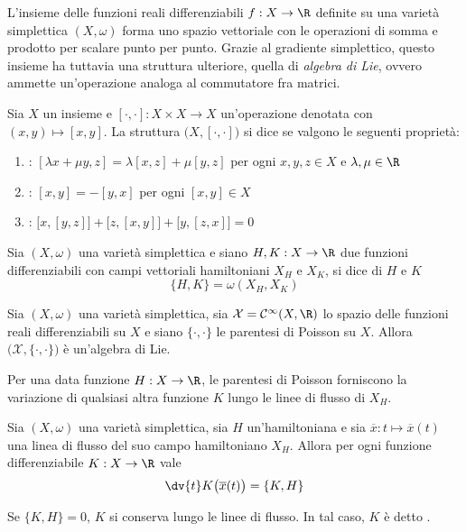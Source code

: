 L'insieme delle funzioni reali differenziabili $f:X \to \R$ definite su una varietà simplettica $(X, \omega)$ forma uno spazio vettoriale con le operazioni di somma e prodotto per scalare punto per punto. Grazie al gradiente simplettico, questo insieme ha tuttavia una struttura ulteriore, quella di \emph{algebra di Lie}, ovvero ammette un'operazione analoga al commutatore fra matrici.
\begin{definition}
  Sia $X$ un insieme e $[\cdot , \cdot]:X \times X \to X$ un'operazione denotata con $(x,y) \mapsto [x,y]$. La struttura $\big(X, [\cdot ,\cdot ]\big)$ si dice  se valgono le seguenti proprietà: \begin{enumerate}
    \item {}: $[\lambda x + \mu y, z] = \lambda [x, z] + \mu[y,z]$ per ogni $x,y,z \in X$ e $\lambda, \mu \in  \R$
    \item {}: $[x,y] = -[y,x]$ per ogni $[x,y] \in X$
    \item {}: $\big[x,[y,z]\big] + \big[z,[x,y]\big] + \big[y,[z,x]\big] = 0$
  \end{enumerate}
\end{definition}

\begin{definition}
  Sia $(X, \omega)$ una varietà simplettica e siano $H,K: X \to \R$ due funzioni differenziabili con campi vettoriali hamiltoniani $X_H$ e $X_K$, si dice  di $H$ e $K$ \begin{equation*}
  \{H,K\} = \omega(X_H,X_K) 
  \end{equation*} 
\end{definition}
\begin{theorem}
  Sia $(X, \omega)$ una varietà simplettica, sia $\mathcal{X} = \mathcal{C}^{\infty}(X,\R)$ lo spazio delle funzioni reali differenziabili su $X$ e siano $\{\cdot , \cdot \}$ le parentesi di Poisson su $X$. Allora $\big(\mathcal{X}, \{\cdot , \cdot\}\big)$ è un'algebra di Lie.
\end{theorem}

Per una data funzione $H:X\to \R$, le parentesi di Poisson forniscono la variazione di qualsiasi altra funzione $K$ lungo le linee di flusso di $X_H$.
\begin{theorem}
  Sia $(X, \omega)$ una varietà simplettica, sia $H$ un'hamiltoniana e sia $\overline{x}:t \mapsto \overline{x}(t)$ una linea di flusso del suo campo hamiltoniano $X_H$. Allora per ogni funzione differenziabile $K:X\to \R$ vale \begin{equation*}
  \dv{t} K\big(\overline{x}(t)\big) = \{K,H\} 
  \end{equation*}  
\end{theorem}
\begin{corollary}
  Se $\{K, H\} = 0$, $K$ si conserva lungo le linee di flusso. In tal caso, $K$ è detto .
\end{corollary}

